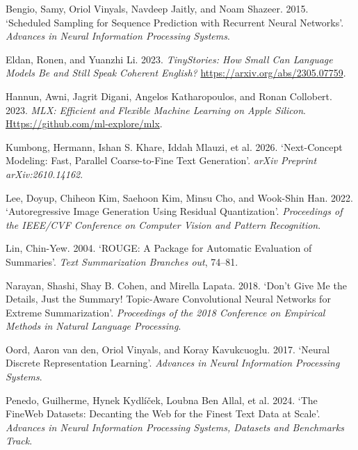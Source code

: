 \documentclass[
  british,
]{article}
\newlength{\cslhangindent}
\newenvironment{CSLReferences}[2] %
 {\begin{list}{}{%
  \setlength{\itemindent}{0pt}
  \setlength{\leftmargin}{0pt}
  \setlength{\parsep}{0pt}
  \ifodd #1
   \setlength{\leftmargin}{\cslhangindent}
   \setlength{\itemindent}{-1\cslhangindent}
  \fi
  \setlength{\itemsep}{#2\baselineskip}}}
 {\end{list}}
\begin{document}
\protect{}\label{refs}
\begin{CSLReferences}{1}{1}
Bengio, Samy, Oriol Vinyals, Navdeep Jaitly, and Noam Shazeer. 2015.
{`Scheduled Sampling for Sequence Prediction with Recurrent Neural
Networks'}. \emph{Advances in Neural Information Processing Systems}.

Eldan, Ronen, and Yuanzhi Li. 2023. \emph{TinyStories: How Small Can
Language Models Be and Still Speak Coherent English?}
\url{https://arxiv.org/abs/2305.07759}.

Hannun, Awni, Jagrit Digani, Angelos Katharopoulos, and Ronan Collobert.
2023. \emph{{MLX}: Efficient and Flexible Machine Learning on Apple
Silicon}.
\href{https://github.com/ml-explore/mlx}{Https://github.com/ml-explore/mlx}.

Kumbong, Hermann, Ishan S. Khare, Iddah Mlauzi, et al. 2026.
{`Next-Concept Modeling: Fast, Parallel Coarse-to-Fine Text
Generation'}. \emph{arXiv Preprint arXiv:2610.14162}.

Lee, Doyup, Chiheon Kim, Saehoon Kim, Minsu Cho, and Wook-Shin Han.
2022. {`Autoregressive Image Generation Using Residual Quantization'}.
\emph{Proceedings of the IEEE/CVF Conference on Computer Vision and
Pattern Recognition}.

Lin, Chin-Yew. 2004. {`{ROUGE}: A Package for Automatic Evaluation of
Summaries'}. \emph{Text Summarization Branches out}, 74--81.

Narayan, Shashi, Shay B. Cohen, and Mirella Lapata. 2018. {`Don't Give
Me the Details, Just the Summary! Topic-Aware Convolutional Neural
Networks for Extreme Summarization'}. \emph{Proceedings of the 2018
Conference on Empirical Methods in Natural Language Processing}.

Oord, Aaron van den, Oriol Vinyals, and Koray Kavukcuoglu. 2017.
{`Neural Discrete Representation Learning'}. \emph{Advances in Neural
Information Processing Systems}.

Penedo, Guilherme, Hynek Kydlíček, Loubna Ben Allal, et al. 2024. {`The
{FineWeb} Datasets: Decanting the Web for the Finest Text Data at
Scale'}. \emph{Advances in Neural Information Processing Systems,
Datasets and Benchmarks Track}.


\end{CSLReferences}
\end{document}
